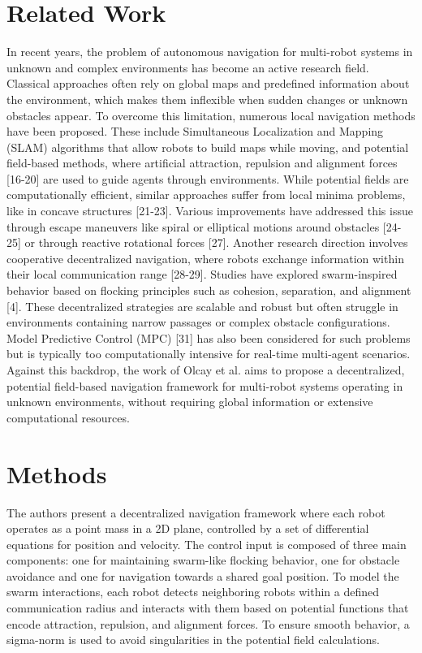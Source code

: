\documentclass[conference]{IEEEtran}
\begin{document}
\section{Related Work}
\cite{Olcay.2020} In recent years, the problem of autonomous navigation for multi-robot systems in unknown and complex environments 
has become an active research field. Classical approaches often rely on global maps and predefined information about the environment, 
which makes them inflexible when sudden changes or unknown obstacles appear. To overcome this limitation, numerous local navigation 
methods have been proposed. These include Simultaneous Localization and Mapping (SLAM) algorithms that allow robots to build maps 
while moving, and potential field-based methods, where artificial attraction, repulsion and alignment forces [16-20] are used to 
guide agents through environments. While potential fields are computationally efficient, similar approaches suffer from local 
minima problems, like in concave structures [21-23]. Various improvements have addressed this issue through escape maneuvers like 
spiral or elliptical motions around obstacles [24-25] or through reactive rotational forces [27]. Another research direction 
involves cooperative decentralized navigation, where robots exchange information within their local communication range [28-29]. 
Studies have explored swarm-inspired behavior based on flocking principles such as cohesion, separation, and alignment [4]. These 
decentralized strategies are scalable and robust but often struggle in environments containing narrow passages or complex obstacle 
configurations. Model Predictive Control (MPC) [31] has also been considered for such problems but is typically too computationally 
intensive for real-time multi-agent scenarios. Against this backdrop, the work of Olcay et al. aims to propose a decentralized, 
potential field-based navigation framework for multi-robot systems operating in unknown environments, without requiring global 
information or extensive computational resources.


\section{Methods}
\cite{Olcay.2020} The authors present a decentralized navigation framework where each robot operates as a point mass in a 2D plane, 
controlled by a set of differential equations for position and velocity. The control input is composed of three main components: one 
for maintaining swarm-like flocking behavior, one for obstacle avoidance and one for navigation towards a shared goal position. To 
model the swarm interactions, each robot detects neighboring robots within a defined communication radius and interacts with them based 
on potential functions that encode attraction, repulsion, and alignment forces. To ensure smooth behavior, a sigma-norm is used to avoid 
singularities in the potential field calculations.
\end{document}
